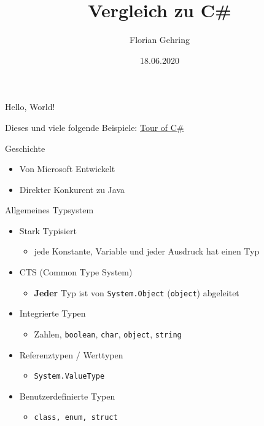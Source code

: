 \documentclass[11pt]{beamer}
\author{Florian Gehring}
\title{Vergleich zu C\#}
\date{18.06.2020}
\begin{document}
\setlength{\columnseprule}{0.4pt}

\begin{frame}
\titlepage
\end{frame}


\begin{frame}{Hello, World!}

Dieses und viele folgende Beispiele: \href{https://docs.microsoft.com/de-de/dotnet/csharp/tour-of-csharp/}{Tour of C\#}

\end{frame}


\begin{frame}{Geschichte}
\begin{itemize}
	\item Von Microsoft Entwickelt
	\item \glqq Direkter Konkurent\grqq{} zu Java
\end{itemize}
\end{frame}


\begin{frame}{Allgemeines Typsystem}
\begin{itemize}
	\item Stark Typisiert
	\begin{itemize}
		\item jede Konstante, Variable und jeder Ausdruck hat einen Typ
	\end{itemize}
	\item CTS (Common Type System)
	\begin{itemize}
		\item \textbf{Jeder} Typ ist von \texttt{System.Object} (\texttt{object}) abgeleitet
	\end{itemize}

	\item Integrierte Typen
	\begin{itemize}
		\item \glqq Zahlen\grqq{}, \texttt{boolean}, \texttt{char}, \texttt{object}, \texttt{string}
	\end{itemize}
	\item Referenztypen / Werttypen
	\begin{itemize}
		\item \texttt{System.ValueType}
	\end{itemize}
	\item Benutzerdefinierte Typen
	\begin{itemize}
		\item \texttt{class, enum, struct}
	\end{itemize}
\end{itemize}
\end{frame}
\end{document}
